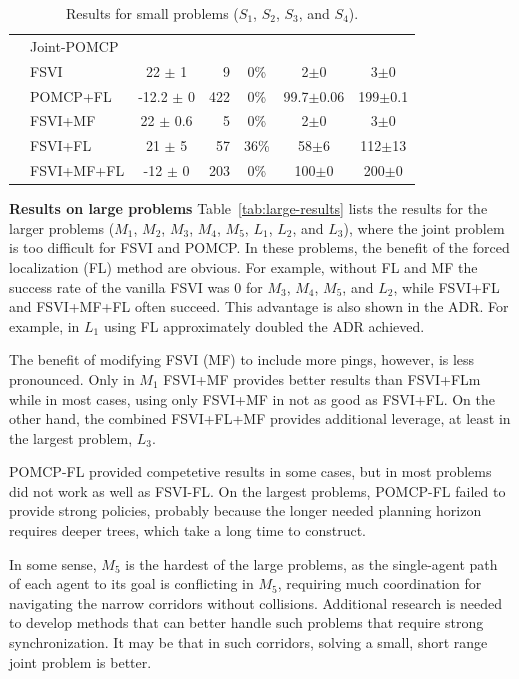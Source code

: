 \documentclass[letterpaper]{article} %
\newcommand{\itay}[1]{}
\begin{document}
\begin{table}
{\begin{tabular}{ |c|l|c|r|c|c|c| }
& Joint-POMCP &&&&& \\
& FSVI\itay{+} & 22 $\pm$ 1 & 9 & 0\% & 2$\pm$0 & 3$\pm$0 \\
& POMCP+FL\itay{+} & -12.2 $\pm$ 0 & 422 & 0\% & 99.7$\pm$0.06 & 199$\pm$0.1 \\
& FSVI+MF\itay{+} & 22 $\pm$ 0.6 & 5 & 0\% &  2$\pm$0 & 3$\pm$0 \\
&FSVI+FL\itay{+} & 21 $\pm$ 5 & 57 & 36\% & 58$\pm$6 & 112$\pm$13 \\
& FSVI+MF+FL\itay{+} & -12 $\pm$ 0 & 203 & 0\% &  100$\pm$0 & 200$\pm$0 \\
\hline
\hline
\end{tabular}
}
\caption{Results for small problems ($S_1$, $S_2$, $S_3$, and $S_4$).\itay{** Average run-time in 200 runs}}
\label{tab:2small-results}
\end{table}




\noindent\textbf{Results on large problems}
Table~\ref{tab:large-results} lists the results for the larger problems ($M_1$, $M_2$, $M_3$, $M_4$, $M_5$, $L_1$, $L_2$, and $L_3$), where the joint problem is too difficult for FSVI and POMCP.
In these problems, the benefit of the forced localization (FL) method are obvious.
For example, without FL and MF the success rate of the vanilla FSVI was 0 for $M_3$, $M_4$, $M_5$, and $L_2$, while
FSVI+FL and FSVI+MF+FL often succeed. This advantage is also shown in the ADR.
For example, in $L_1$ using FL approximately doubled the ADR achieved.


The benefit of modifying FSVI (MF) to include more pings, however, is less pronounced. Only in $M_1$ FSVI+MF provides better results than FSVI+FLm while in most cases, using only FSVI+MF in not as good as FSVI+FL. On the other hand, the combined FSVI+FL+MF provides additional leverage, at least in the largest problem, $L_3$.

POMCP-FL provided competetive results in some cases, but in most problems did not work as well as FSVI-FL. On the largest problems, POMCP-FL failed to provide strong policies, probably because the longer needed planning horizon requires deeper trees, which take a long time to construct.

In some sense, $M_5$ is the hardest of the large problems, as the single-agent path of each agent to its goal is conflicting in $M_5$, requiring much coordination for navigating the narrow corridors without collisions.
Additional research is needed to develop methods that can better handle such problems that require strong synchronization. It may be that in such corridors, solving a small, short range joint problem is better.
\end{document}
